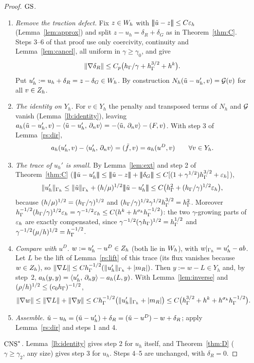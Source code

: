\begin{proof}
\emph{$\mathrm{GS}$.}
\begin{enumerate}
\item \emph{Remove the traction defect.} Fix $z\in W_h$ with $|\!|\!|\tilde u-z|\!|\!|\le C\varepsilon_h$ (Lemma~\ref{lem:approx}) and split $z-u_h=\delta_R+\delta_G$ as in Theorem~\ref{thm:C}. Steps 3--6 of that proof use only coercivity, continuity and Lemma~\ref{lem:cancel}, all uniform in $\gamma\ge\gamma_0$, and give
\[
\lVert \nabla\delta_R\rVert\le C_p\bigl(h_\Gamma/\gamma+h_\Gamma^{3/2}+h^k\bigr).
\]
Put $u_h':=u_h+\delta_R=z-\delta_G\in W_h$. By construction $N_h(\tilde u-u_h',v)=\mathcal G(v)$ for all $v\in Z_h$.
\item \emph{The identity on $Y_h$.} For $v\in Y_h$ the penalty and transposed terms of $N_h$ and $\mathcal G$ vanish (Lemma~\ref{lb:identity}), leaving $a_h(\tilde u-u_h',v)-\langle \tilde u-u_h',\, \partial_n v\rangle=-\langle \tilde u,\, \partial_n v\rangle-(F,v)$. With step 3 of Lemma~\ref{rs:dir},
\[
a_h(u_h',v)-\langle u_h',\, \partial_n v\rangle=(\tilde f,v)=a_h(u^D,v)\qquad\forall v\in Y_h .
\]
\item \emph{The trace of $u_h'$ is small.} By Lemma~\ref{lem:ext} and step 2 of Theorem~\ref{thm:C} ($\tnorm{\ut-u_h'}\le\tnorm{\ut-z}+\tnorm{\delta_G}\le C[(1+\gamma^{1/2})\hG^{3/2}+\eps]$),
\[
\lVert u_h'\rVert_{\Gamma_h}\le\lVert \tilde u\rVert_{\Gamma_h}+(h/\mu)^{1/2}|\!|\!|\tilde u-u_h'|\!|\!|\le C\bigl(h_\Gamma^2+(h_\Gamma/\gamma)^{1/2}\varepsilon_h\bigr),
\]
because $(h/\mu)^{1/2}=(h_\Gamma/\gamma)^{1/2}$ and $(h_\Gamma/\gamma)^{1/2}\gamma^{1/2}h_\Gamma^{3/2}=h_\Gamma^2$. Moreover $h_\Gamma^{-1/2}(h_\Gamma/\gamma)^{1/2}\varepsilon_h=\gamma^{-1/2}\varepsilon_h\le C(h^k+h^{\sigma_k}h_\Gamma^{-1/2})$: the two $\gamma$-growing parts of $\varepsilon_h$ are exactly compensated, since $\gamma^{-1/2}(\gamma h_\Gamma)^{1/2}=h_\Gamma^{1/2}$ and $\gamma^{-1/2}(\mu/h)^{1/2}=h_\Gamma^{-1/2}$.
\item \emph{Compare with $u^D$.} $w:=u_h'-u^D\in Z_h$ (both lie in $W_h$), with $w|_{\Gamma_h}=u_h'-ab$. Let $L$ be the lift of Lemma~\ref{rs:lift} of this trace (its flux vanishes because $w\in Z_h$), so $\lVert \nabla L\rVert\le Ch_\Gamma^{-1/2}(\lVert u_h'\rVert_{\Gamma_h}+|m_R|)$. Then $y:=w-L\in Y_h$ and, by step~2, $a_h(y,y)=\langle u_h',\, \partial_n y\rangle-a_h(L,y)$. With Lemma~\ref{lem:inverse} and $(\rho/h)^{1/2}\le(c_0h_\Gamma)^{-1/2}$,
\[
\lVert \nabla w\rVert\le\lVert \nabla L\rVert+\lVert \nabla y\rVert\le Ch_\Gamma^{-1/2}\bigl(\lVert u_h'\rVert_{\Gamma_h}+|m_R|\bigr)\le C\bigl(h_\Gamma^{3/2}+h^k+h^{\sigma_k}h_\Gamma^{-1/2}\bigr).
\]
\item \emph{Assemble.} $\tilde u-u_h=(\tilde u-u_h')+\delta_R=(\tilde u-u^D)-w+\delta_R$; apply Lemma~\ref{rs:dir} and steps 1 and 4.
\end{enumerate}
\emph{$\mathrm{CNS}^\ast$.} Lemma~\ref{lb:identity} gives step 2 for $u_h$ itself, and Theorem~\ref{thm:D} ($\gamma\ge\gamma_2$, any size) gives step 3 for $u_h$. Steps 4--5 are unchanged, with $\delta_R=0$.
\end{proof}

